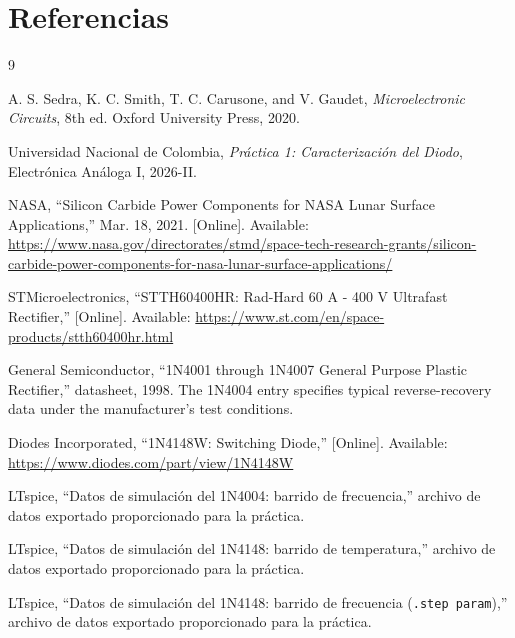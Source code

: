 \documentclass[journal,a4paper]{IEEEtran}
\begin{document}
\section{Referencias}

\begin{thebibliography}{9}

A. S. Sedra, K. C. Smith, T. C. Carusone, and V. Gaudet, \textit{Microelectronic Circuits}, 8th ed. Oxford University Press, 2020.

Universidad Nacional de Colombia, \textit{Práctica 1: Caracterización del Diodo}, Electrónica Análoga I, 2026-II.

NASA, ``Silicon Carbide Power Components for NASA Lunar Surface Applications,'' Mar. 18, 2021. [Online]. Available: \url{https://www.nasa.gov/directorates/stmd/space-tech-research-grants/silicon-carbide-power-components-for-nasa-lunar-surface-applications/}

STMicroelectronics, ``STTH60400HR: Rad-Hard 60 A - 400 V Ultrafast Rectifier,'' [Online]. Available: \url{https://www.st.com/en/space-products/stth60400hr.html}

General Semiconductor, ``1N4001 through 1N4007 General Purpose Plastic Rectifier,'' datasheet, 1998. The 1N4004 entry specifies typical reverse-recovery data under the manufacturer's test conditions.

Diodes Incorporated, ``1N4148W: Switching Diode,'' [Online]. Available: \url{https://www.diodes.com/part/view/1N4148W}

LTspice, ``Datos de simulación del 1N4004: barrido de frecuencia,'' archivo de datos exportado proporcionado para la práctica.

LTspice, ``Datos de simulación del 1N4148: barrido de temperatura,'' archivo de datos exportado proporcionado para la práctica.

LTspice, ``Datos de simulación del 1N4148: barrido de frecuencia (\texttt{.step param}),'' archivo de datos exportado proporcionado para la práctica.

\end{thebibliography}
\end{document}
